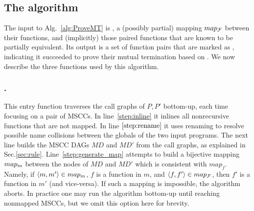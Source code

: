 \subsection{The algorithm}
The input to Alg.~\ref{alg:ProveMT} is , a (possibly partial) mapping $map_{\cal F}$ between their functions, and (implicitly) those paired functions that are known to be partially equivalent. Its output is a set of function pairs that are marked as \mtlabel, indicating it succeeded to prove their mutual termination based on \mtermdp. We now describe the three functions used by this algorithm.


\subsubsection{\ProveMT.} \label{sec:ProveMT}
This entry function traverses the call
graphs of $P,P'$ bottom-up, each time focusing on a pair of MSCCs. In
line~\ref{step:inline} it inlines all nonrecursive functions that are not
mapped. In line $\ref{step:rename}$ it uses renaming to resolve possible name
collisions between the globals of the two input programs. The next line builds
the MSCC DAGs $MD$ and $MD'$ from the call graphs, as explained in
Sec.\ref{sec:rule}. Line~\ref{step:generate_map} attempts to build a bijective
mapping $map_m$ between the nodes of $MD$ and $MD'$ which is consistent with
$map_f$. Namely, if $\langle m,m'\rangle \in map_m$, $f$ is a function in $m$, and
$\langle f,f'\rangle \in map_{\cal F}$, then $f'$ is a function in $m'$ (and vice-versa). If
such a mapping is impossible, the algorithm aborts. In practice one may run the
algorithm bottom-up until reaching nonmapped MSCCs, but we omit this option
here for brevity.

